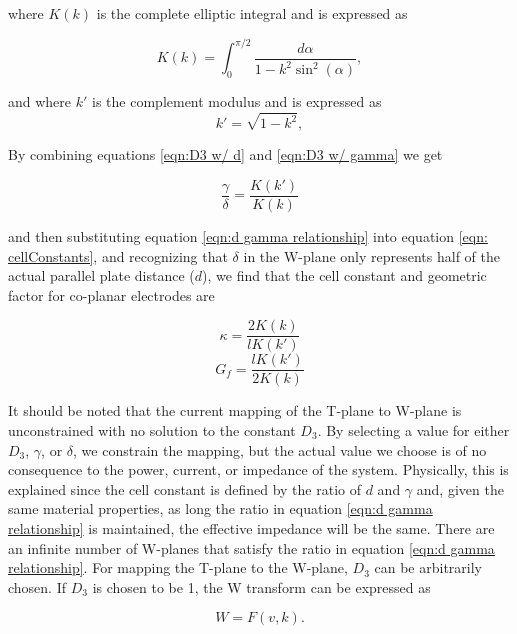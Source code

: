 \noindent where $K(k)$ is the complete elliptic integral and is expressed as 

 \begin{equation}
     K(k) = \int_0^{\pi/2} \frac{d\alpha}{1 - k^2\sin^2(\alpha)},
 \end{equation}
 
 \noindent and where $k'$ is the complement modulus and is expressed as 
 \begin{equation}
     k' = \sqrt{1-k^2},
 \end{equation}

\noindent By combining equations \ref{eqn:D3 w/ d} and \ref{eqn:D3 w/ gamma} we get

\begin{equation}
    \frac{\gamma}{\delta} = \frac{K(k')}{K(k)}
    \label{eqn:d gamma relationship}
\end{equation}

\noindent and then substituting equation \ref{eqn:d gamma relationship} into equation \ref{eqn: cellConstants}, and recognizing that $\delta$ in the W-plane only represents half of the actual parallel plate distance ($d$), we find that the cell constant and geometric factor for co-planar electrodes are 

\begin{equation}
    \kappa = \frac{2K(k)}{lK(k')}
    \label{eqn: cellConstantSolution}
\end{equation}
\begin{equation}
    G_f = \frac{lK(k')}{2K(k)}
\end{equation}

\par It should be noted that the current mapping of the T-plane to W-plane is unconstrained with no solution to the constant $D_3$. By selecting a value for either $D_3$, $\gamma$, or $\delta$, we constrain the mapping, but the actual value we choose is of no consequence to the power, current, or impedance of the system. Physically, this is explained since the cell constant is defined by the ratio of $d$ and $\gamma$ and, given the same material properties, as long the ratio in equation \ref{eqn:d gamma relationship} is maintained, the effective impedance will be the same. There are an infinite number of W-planes that satisfy the ratio in equation \ref{eqn:d gamma relationship}. For mapping the T-plane to the W-plane, $D_3$ can be arbitrarily chosen. If $D_3$ is chosen to be 1, the W transform can be expressed as 

\begin{equation}
    W = F(v,k).
    \label{eqn: w_mapping}
\end{equation}


